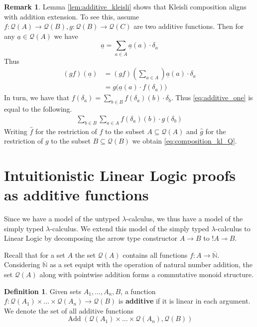 \documentclass[12pt]{article}
\theoremstyle{plain}
\theoremstyle{definition}
\newtheorem{defn}[thm]{Definition} %
\newtheorem{remark}[thm]{Remark}
\newcommand{\bb}[1]{\mathbb{#1}}
\newcommand{\barN}{\overline{\bb{N}}}
\newcommand{\call}[1]{\mathcal{#1}}
\newcommand{\Qcal}{\call{Q}}
\newcommand{\lto}{\longrightarrow}
\begin{document}
\begin{remark}
	Lemma \ref{lem:additive_kleisli} shows that Kleisli composition aligns with addition extension. To see this, assume $f: \call{Q}(A) \lto \call{Q}(B), g: \call{Q}(B) \lto \call{Q}(C)$ are two additive functions. Then for any $\underline{a} \in \call{Q}(A)$ we have
	\begin{equation}
		\underline{a} = \sum_{a \in A}\underline{a}(a) \cdot \delta_{a}
	\end{equation}
	Thus
	\begin{align}
		(gf)(\underline{a}) &= (gf)(\sum_{a \in A})\underline{a}(a) \cdot \delta_{a}\\
		&\label{eq:additive_one}= g\big(\underline{a}(a) \cdot f(\delta_{a})\big)
	\end{align}
	In turn, we have that $f(\delta_a) = \sum_{b \in B}f(\delta_a)(b) \cdot \delta_b$. Thus \eqref{eq:additive_one} is equal to the following.
	\begin{align*}
		\sum_{b \in B}\sum_{a \in A}f(\delta_a)(b) \cdot g(\delta_b)
	\end{align*}
	Writing $\hat{f}$ for the restriction of $f$ to the subset $A \subseteq \call{Q}(A)$ and $\hat{g}$ for the restriction of $g$ to the subset $B \subseteq \call{Q}(B)$ we obtain \eqref{eq:composition_kl_Q}.
\end{remark}
	
\section{Intuitionistic Linear Logic proofs as additive functions}
	Since we have a model of the untyped $\lambda$-calculus, we thus have a model of the simply typed $\lambda$-calculus. We extend this model of the simply typed $\lambda$-calculus to Linear Logic by decomposing the arrow type constructor $A \lto B$ to $!A \multimap B$.
	
	Recall that for a set $A$ the set $\Qcal(A)$ contains all functions $f: A \lto \barN$. Considering $\barN$ as a set equipt with the operation of natural number addition, the set $\Qcal(A)$ along with pointwise addition forms a commutative monoid structure.
	
	\begin{defn}
		Given sets $A_1, \ldots, A_n, B$, a function $f: \Qcal(A_1) \times \ldots \times \Qcal(A_n) \lto \Qcal(B)$ is \textbf{additive} if it is linear in each argument. We denote the set of all additive functions
		\begin{equation}
			\operatorname{Add}(\Qcal(A_1) \times \ldots \times \Qcal(A_n), \Qcal(B))
			\end{equation}
		\end{defn}
	
\end{document}
